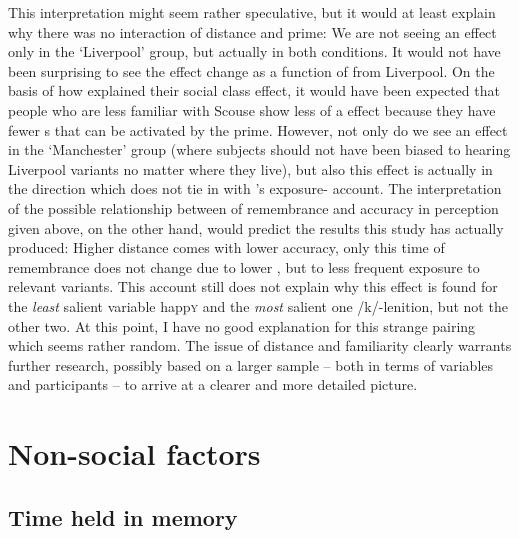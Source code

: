 This interpretation might seem rather speculative, but it would at least explain why there was no interaction of distance and prime: We are not seeing an effect only in the `Liverpool' group, but actually in both conditions.
It would not have been surprising to see the  effect change as a function of  from Liverpool.
On the basis of how \textcite{haydrager2010} explained their social class effect, it would have been expected that people who are less familiar with Scouse show less of a  effect because they have fewer s that can be activated by the prime.
However, not only do we see an effect in the `Manchester' group (where subjects should not have been biased to hearing Liverpool variants no matter where they live), but also this effect is actually in the direction which does not tie in with \citeauthor{haydrager2010}'s exposure- account.
The interpretation of the possible relationship between  of remembrance and accuracy in perception given above, on the other hand, would predict the results this study has actually produced: Higher distance comes with lower accuracy, only this time  of remembrance does not change due to lower , but to less frequent exposure to relevant variants.
This account still does not explain why this effect is found for the \emph{least} salient variable happ\textsc{y} and the \emph{most} salient one /k/-lenition, but not the other two.
At this point, I have no good explanation for this strange pairing which seems rather random.
The issue of distance and familiarity clearly warrants further research, possibly based on a larger sample -- both in terms of variables and participants -- to arrive at a clearer and more detailed picture.

	\section{Non-social factors}
		\label{sec.perc_res.disc.nonsocial}

		\subsection{Time held in memory}

